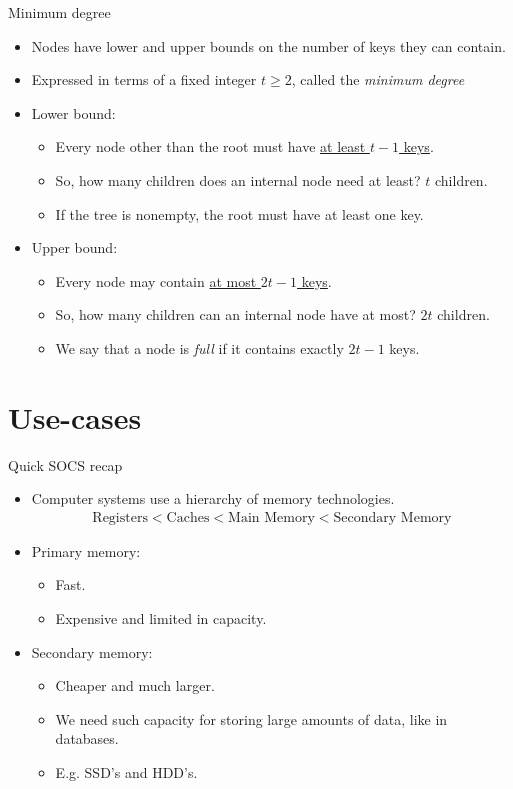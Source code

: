 \documentclass[11pt,t]{beamer}
\begin{document}
	\begin{frame}{Minimum degree}
		\begin{itemize}[<+->]
			\item Nodes have lower and upper bounds on the number of keys they can contain.
			\item Expressed in terms of a fixed integer \(t \geq 2\), called the \textit{minimum degree}
			\item Lower bound: \begin{itemize}[<+->\enspace]
				\item Every node other than the root must have \underline{at least \(t-1\) keys}.
				\item So, how many children does an internal node need at least? \onslide<+-> \(t\) children.
				\item If the tree is nonempty, the root must have at least one key.
			\end{itemize}
			\item Upper bound: \begin{itemize}[<+->\enspace]
				\item Every node may contain \underline{at most \(2t-1\) keys}.
				\item So, how many children can an internal node have at most? \onslide<+-> \(2t\) children.
				\item We say that a node is \textit{full} if it contains exactly \(2t-1\) keys.
			\end{itemize}
		\end{itemize}
	\end{frame}

	\section{Use-cases}

	\begin{frame}{Quick SOCS recap}
		\begin{itemize}[<+->]
			\item Computer systems use a hierarchy of memory technologies.  \begin{align*}
				\text{Registers} < \text{Caches} < \text{Main Memory} < \text{Secondary Memory}
			\end{align*}
			\item Primary memory: \begin{itemize}[<+->]
				\item Fast.
				\item Expensive and limited in capacity.
			\end{itemize}
			\item Secondary memory: \begin{itemize}[<+->]
				\item Cheaper and much larger.
				\item We need such capacity for storing large amounts of data, like in databases.
				\item E.g. SSD's and HDD's.
			\end{itemize}
		\end{itemize}
	\end{frame}
\end{document}
